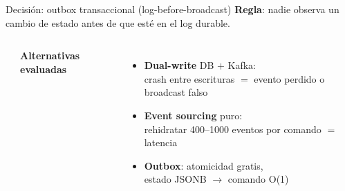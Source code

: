 \documentclass[aspectratio=169,10pt]{beamer}
\begin{document}
\begin{frame}{Decisión: outbox transaccional (log-before-broadcast)}
  \textbf{Regla}: nadie observa un cambio de estado antes de que esté en el log durable.
  \vspace{2mm}
  \begin{columns}[T]
      \begin{center}
      \end{center}
      \textbf{Alternativas evaluadas}
      \begin{itemize}
        \item[\textcolor{cRedis}{\ding{55}}] \textbf{Dual-write} DB $+$ Kafka:\\
              {\scriptsize crash entre escrituras $=$ evento perdido o broadcast falso}
        \item[\textcolor{cRedis}{\ding{55}}] \textbf{Event sourcing} puro:\\
              {\scriptsize rehidratar 400--1000 eventos por comando $=$ latencia}
        \item[\textcolor{cPG}{\ding{51}}] \textbf{Outbox}: atomicidad gratis,\\
              {\scriptsize estado JSONB $\to$ comando O(1)}
      \end{itemize}
  \end{columns}
\end{frame}
\end{document}
